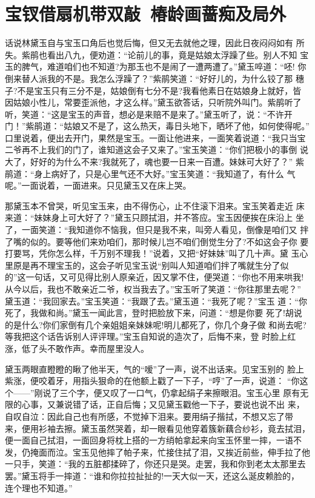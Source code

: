 \chapter{宝钗借扇机带双敲~椿龄画蔷痴及局外}

话说林黛玉自与宝玉口角后也觉后悔，但又无去就他之理，因此日夜闷闷如有
所失。紫鹃也看出八九，便劝道：“论前儿的事，竟是姑娘太浮躁了些。别人不知
宝玉的脾气，难道咱们也不知道?为那玉也不是闹了一遭两遭了。”黛玉啐道：“呸!
你倒来替人派我的不是。我怎么浮躁了？”紫鹃笑道：“好好儿的，为什么铰了那
穗子?不是宝玉只有三分不是，姑娘倒有七分不是?我看他素日在姑娘身上就好，皆
因姑娘小性儿，常要歪派他，才这么样。”黛玉欲答话，只听院外叫门。紫鹃听了
听，笑道：“这是宝玉的声音，想必是来赔不是来了。”黛玉听了，说：“不许开
门！”紫鹃道：“姑娘又不是了，这么热天，毒日头地下，晒坏了他，如何使得呢。”
口里说着，便出去开门，果然是宝玉。一面让他进来，一面笑着说道：“我只当宝
二爷再不上我们的门了，谁知道这会子又来了。”宝玉笑道：“你们把极小的事倒
说大了，好好的为什么不来?我就死了，魂也要一日来一百遭。妹妹可大好了？”
紫鹃道：“身上病好了，只是心里气还不大好。”宝玉笑道：“我知道了，有什么
气呢。”一面说着，一面进来。只见黛玉又在床上哭。

那黛玉本不曾哭，听见宝玉来，由不得伤心，止不住滚下泪来。宝玉笑着走近
床来道：“妹妹身上可大好了？”黛玉只顾拭泪，并不答应。宝玉因便挨在床沿上
坐了，一面笑道：“我知道你不恼我，但只是我不来，叫旁人看见，倒像是咱们又
拌了嘴的似的。要等他们来劝咱们，那时候儿岂不咱们倒觉生分了?不如这会子你
要打要骂，凭你怎么样，千万别不理我！”说着，又把“好妹妹”叫了几十声。黛
玉心里原是再不理宝玉的，这会子听见宝玉说“别叫人知道咱们拌了嘴就生分了似
的”这一句话，又可见得比别人原亲近，因又掌不住，便哭道：“你也不用来哄我!
从今以后，我也不敢亲近二爷，权当我去了。”宝玉听了笑道：“你往那里去呢？”
黛玉道：“我回家去。”宝玉笑道：“我跟了去。”黛玉道：“我死了呢？”宝玉
道：“你死了，我做和尚。”黛玉一闻此言，登时把脸放下来，问道：“想是你要
死了!胡说的是什么?你们家倒有几个亲姐姐亲妹妹呢!明儿都死了，你几个身子做
和尚去呢?等我把这个话告诉别人评评理。”宝玉自知说的造次了，后悔不来，登
时脸上红涨，低了头不敢作声。幸而屋里没人。

黛玉两眼直瞪瞪的瞅了他半天，气的“嗳”了一声，说不出话来。见宝玉别的
脸上紫涨，便咬着牙，用指头狠命的在他额上戳了一下子，“哼”了一声，说道：
“你这个——”刚说了三个字，便又叹了一口气，仍拿起绢子来擦眼泪。宝玉心里
原有无限的心事，又兼说错了话，正自后悔；又见黛玉戳他一下子，要说也说不出
来，自叹自泣：因此自己也有所感，不觉掉下泪来。要用绢子揩拭，不想又忘了带
来，便用衫袖去擦。黛玉虽然哭着，却一眼看见他穿着簇新藕合纱衫，竟去拭泪，
便一面自己拭泪，一面回身将枕上搭的一方绡帕拿起来向宝玉怀里一摔，一语不
发，仍掩面而泣。宝玉见他摔了帕子来，忙接住拭了泪，又挨近前些，伸手拉了他
一只手，笑道：“我的五脏都揉碎了，你还只是哭。走罢，我和你到老太太那里去
罢。”黛玉将手一摔道：“谁和你拉拉扯扯的!一天大似一天，还这么涎皮赖脸的，
连个理也不知道。”

